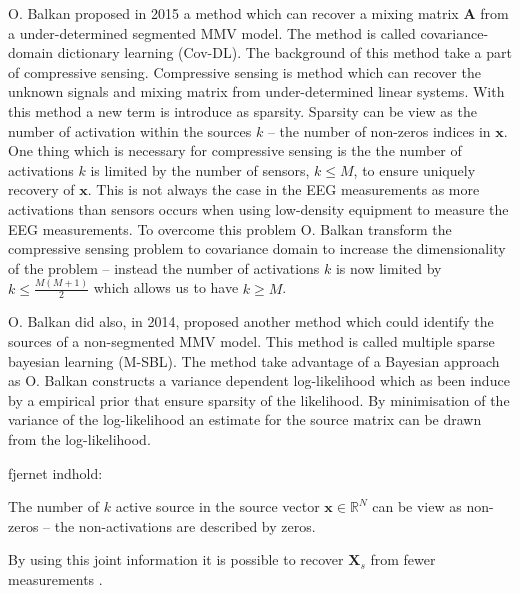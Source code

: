 O. Balkan \cite{Balkan2015} proposed in 2015 a method which can recover a mixing matrix $\mathbf{A}$ from a under-determined segmented MMV model. 
The method is called covariance-domain dictionary learning (Cov-DL).
The background of this method take a part of compressive sensing. 
Compressive sensing is method which can recover the unknown signals and mixing matrix from under-determined linear systems. 
With this method a new term is introduce as sparsity. Sparsity can be view as the number of activation within the sources $k$ -- the number of non-zeros indices in $\mathbf{x}$.
One thing which is necessary for compressive sensing is the the number of activations $k$ is limited by the number of sensors, $k \leq M$, to ensure uniquely recovery of $\mathbf{x}$.
This is not always the case in the EEG measurements as more activations than sensors occurs when using low-density equipment to measure the EEG measurements.
To overcome this problem O. Balkan transform the compressive sensing problem to covariance domain to increase the dimensionality of the problem -- instead the number of activations $k$ is now limited by $k \leq \frac{M(M+1)}{2}$ which allows us to have $k \geq M$.

O. Balkan \cite{Balkan2014} did also, in 2014, proposed another method which could identify the sources of a non-segmented MMV model. 
This method is called multiple sparse bayesian learning (M-SBL).
The method take advantage of a Bayesian approach as O. Balkan constructs a variance dependent log-likelihood which as been induce by a empirical prior that ensure sparsity of the likelihood. 
By minimisation of the variance of the log-likelihood an estimate for the source matrix can be drawn from the log-likelihood.


fjernet indhold:


The number of $k$ active source in the source vector $\mathbf{x} \in \mathbb{R}^N$ can be view as non-zeros -- the non-activations are described by zeros. 

By using this joint information it is possible to recover $\mathbf{X}_s$ from fewer measurements \cite[p. 43]{CS}.

